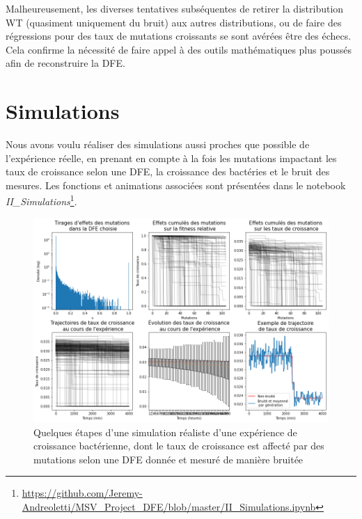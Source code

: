 \documentclass[12pt]{article}
\begin{document}
Malheureusement, les diverses tentatives subséquentes de retirer la distribution WT (quasiment uniquement du bruit) aux autres distributions, ou de faire des régressions pour des taux de mutations croissants se sont avérées être des échecs. Cela confirme la nécessité de faire appel à des outils mathématiques plus poussés afin de reconstruire la DFE.

\FloatBarrier
\section{Simulations\label{s:sim}}

Nous avons voulu réaliser des simulations aussi proches que possible de l'expérience réelle, en prenant en compte à la fois les mutations impactant les taux de croissance selon une DFE, la croissance des bactéries et le bruit des mesures. Les fonctions et animations associées sont présentées dans le notebook \emph{II\_Simulations}\footnote{\url{https://github.com/Jeremy-Andreoletti/MSV_Project_DFE/blob/master/II_Simulations.ipynb}}.

\begin{figure}[h]
  \begin{center}
    \vspace{3mm}
    \includegraphics[scale=0.5]{../Img/Simulations.png}
  \end{center} 
  \caption{\label{fig:simulations}Quelques étapes d'une simulation réaliste d'une expérience de croissance bactérienne, dont le taux de croissance est affecté par des mutations selon une DFE donnée et mesuré de manière bruitée}
\end{figure}
\end{document}
